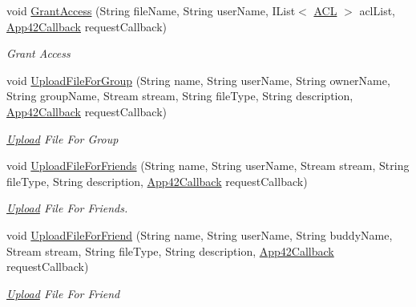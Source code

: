 \begin{DoxyCompactItemize}
\item 
void \hyperlink{classcom_1_1shephertz_1_1app42_1_1paas_1_1sdk_1_1windows_1_1upload_1_1_upload_service_a98013f2ed56c6d66d4c757617f327d75}{Grant\+Access} (String file\+Name, String user\+Name, I\+List$<$ \hyperlink{classcom_1_1shephertz_1_1app42_1_1paas_1_1sdk_1_1windows_1_1_a_c_l}{A\+C\+L} $>$ acl\+List, \hyperlink{interfacecom_1_1shephertz_1_1app42_1_1paas_1_1sdk_1_1windows_1_1_app42_callback}{App42\+Callback} request\+Callback)
\begin{DoxyCompactList}\small\item\em Grant Access \end{DoxyCompactList}\item 
void \hyperlink{classcom_1_1shephertz_1_1app42_1_1paas_1_1sdk_1_1windows_1_1upload_1_1_upload_service_a4816b5deb7a5ac74c8f79098619bb435}{Upload\+File\+For\+Group} (String name, String user\+Name, String owner\+Name, String group\+Name, Stream stream, String file\+Type, String description, \hyperlink{interfacecom_1_1shephertz_1_1app42_1_1paas_1_1sdk_1_1windows_1_1_app42_callback}{App42\+Callback} request\+Callback)
\begin{DoxyCompactList}\small\item\em \hyperlink{classcom_1_1shephertz_1_1app42_1_1paas_1_1sdk_1_1windows_1_1upload_1_1_upload}{Upload} File For Group \end{DoxyCompactList}\item 
void \hyperlink{classcom_1_1shephertz_1_1app42_1_1paas_1_1sdk_1_1windows_1_1upload_1_1_upload_service_aead932dc2500c7f10152fe38a841295e}{Upload\+File\+For\+Friends} (String name, String user\+Name, Stream stream, String file\+Type, String description, \hyperlink{interfacecom_1_1shephertz_1_1app42_1_1paas_1_1sdk_1_1windows_1_1_app42_callback}{App42\+Callback} request\+Callback)
\begin{DoxyCompactList}\small\item\em \hyperlink{classcom_1_1shephertz_1_1app42_1_1paas_1_1sdk_1_1windows_1_1upload_1_1_upload}{Upload} File For Friends. \end{DoxyCompactList}\item 
void \hyperlink{classcom_1_1shephertz_1_1app42_1_1paas_1_1sdk_1_1windows_1_1upload_1_1_upload_service_a365f1fecabc44f89879381381d3593b7}{Upload\+File\+For\+Friend} (String name, String user\+Name, String buddy\+Name, Stream stream, String file\+Type, String description, \hyperlink{interfacecom_1_1shephertz_1_1app42_1_1paas_1_1sdk_1_1windows_1_1_app42_callback}{App42\+Callback} request\+Callback)
\begin{DoxyCompactList}\small\item\em \hyperlink{classcom_1_1shephertz_1_1app42_1_1paas_1_1sdk_1_1windows_1_1upload_1_1_upload}{Upload} File For Friend \end{DoxyCompactList}\item 

\end{DoxyCompactItemize}
